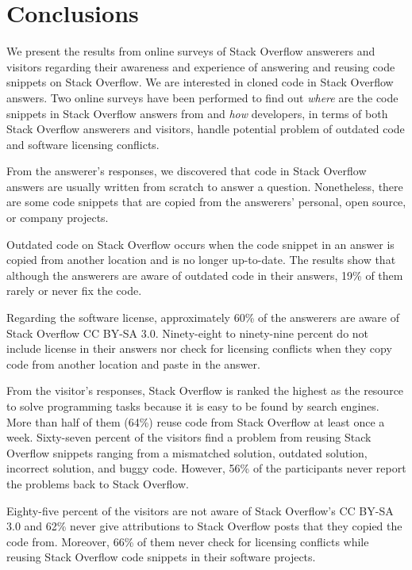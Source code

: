 \documentclass{svjour3}                     %
\begin{document}
\section{Conclusions}

We present the results from online surveys of Stack Overflow answerers and
visitors regarding their awareness and experience of answering and reusing code
snippets on Stack Overflow. We are interested in cloned code in Stack Overflow
answers. Two online surveys have been performed to find out \textit{where} are the code
snippets in Stack Overflow answers from and \textit{how} developers, in terms of both
Stack Overflow answerers and visitors, handle potential problem of outdated code
and software licensing conflicts.

From the answerer's responses, we discovered that code in Stack Overflow answers are usually written from
scratch to answer a question. Nonetheless, there are some code snippets that are
copied from the answerers' personal, open source, or company projects.

Outdated code on Stack Overflow occurs when the code snippet in an answer is
copied from another location and is no longer up-to-date. The results show that
although the answerers are aware of outdated code in their answers, 19\% of them
rarely or never fix the code.

Regarding the software license, approximately 60\% of the answerers are aware
of Stack Overflow CC BY-SA 3.0. Ninety-eight to ninety-nine percent do not include
license in their answers nor check for licensing conflicts when they copy code from
another location and paste in the answer.

From the visitor's responses, Stack Overflow is ranked the highest as the resource to
solve programming tasks because it is easy to be found by search engines. More than
half of them (64\%) reuse code from Stack Overflow at least once a week. Sixty-seven percent of the visitors
find a problem from reusing Stack Overflow snippets ranging from a mismatched solution,
outdated solution, incorrect solution, and buggy code. However, 56\% of the participants never
report the problems back to Stack Overflow.

Eighty-five percent of the visitors are not aware of Stack Overflow's CC BY-SA 3.0 and 62\% never
give attributions to Stack Overflow posts that they copied the code from. Moreover, 66\% of them
never check for licensing conflicts while reusing Stack Overflow code snippets in their software
projects.
\end{document}
